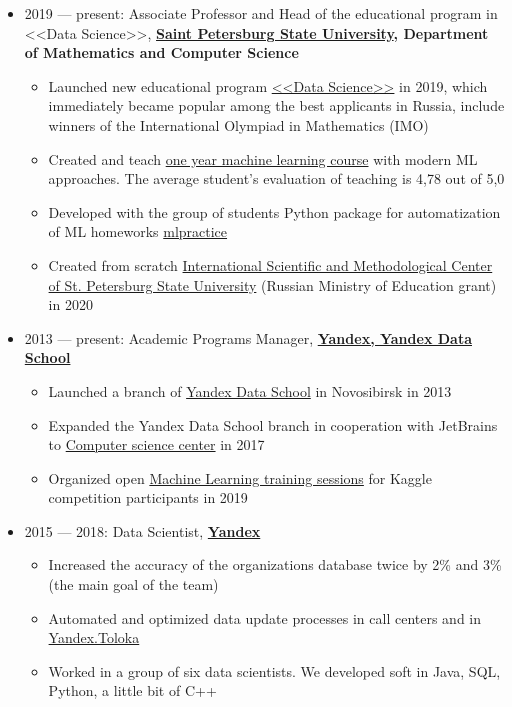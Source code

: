 \documentclass[11pt]{article}
\begin{document}
\begin{itemize}
 \item 2019 — present:
 Associate Professor and Head of the educational program in <<Data Science>>,  \textbf{\href{https://spbu.ru}{Saint Petersburg State University}, Department of Mathematics and Computer Science}
 \begin{itemize}
	 \item Launched new educational program \href{https://maad.compscicenter.ru}{<<Data Science>>} in 2019, which immediately became popular among the best applicants in Russia, include winners of the International Olympiad in Mathematics (IMO)
	 \item Created and teach \href{https://github.com/spbu-math-cs/ml-course/}{one year machine learning course} with modern ML approaches. The average student's evaluation of teaching is 4,78 out of 5,0
	 \item Developed with the group of students Python package for automatization of ML homeworks \href{https://github.com/avalur/mlpractice}{mlpractice}
	 \item Created from scratch \href{https://gsom.spbu.ru/all_news/event2021-02-04/}{International Scientific and Methodological Center of St. Petersburg State University} (Russian Ministry of Education grant) in 2020
 \end{itemize}

  \item 2013 — present:
	Academic Programs Manager, \textbf{\href{https://yandexdataschool.ru}{Yandex, Yandex Data School}}
	\begin{itemize}
		\item Launched a branch of \href{https://yandexdataschool.ru}{Yandex Data School} in Novosibirsk in 2013
		\item Expanded the Yandex Data School branch in cooperation with JetBrains to \href{https://compscicenter.ru}{Computer science center} in 2017
		\item Organized open \href{https://habr.com/ru/company/JetBrains-education/blog/458042/}{Machine Learning training sessions} for Kaggle competition participants in 2019
	\end{itemize}

  \item 2015 — 2018:
	Data Scientist, \textbf{\href{https://yandex.ru/}{Yandex}}
	\begin{itemize}
		\item Increased the accuracy of the organizations database twice by 2\% and 3\% (the main goal of the team)
		\item Automated and optimized data update processes in call centers and in \href{https://toloka.yandex.ru}{Yandex.Toloka}
		\item Worked in a group of six data scientists. We developed soft in Java, SQL, Python, a little bit of C++
	\end{itemize}


\end{itemize}
\end{document}
